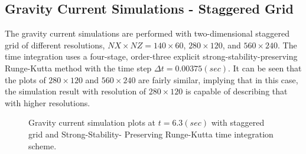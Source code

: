 \normalsize
\subsection{Gravity Current Simulations - Staggered Grid}
\label{chapter:NumericalTest-Staggered}

The gravity current simulations are performed with two-dimensional staggered grid of different resolutions, $NX \times NZ = 140 \times 60$, $280 \times 120$, and $560 \times 240$. The time integration uses a four-stage, order-three explicit strong-stability-preserving Runge-Kutta method \cite{Ruuth2004} with the time step $\Delta t = 0.00375 (sec)$. It can be seen that the plots of $280 \times 120$ and $560 \times 240$ are fairly similar, implying that in this case, the simulation result with resolution of $280 \times 120$ is capable of describing that with higher resolutions.
\begin{figure}[htbp]
  \begin{center}
\caption{Gravity current simulation plots at $t=6.3 (sec)$ with staggered grid and Strong-Stability- Preserving Runge-Kutta time integration scheme.}
  \end{center}
\end{figure}


